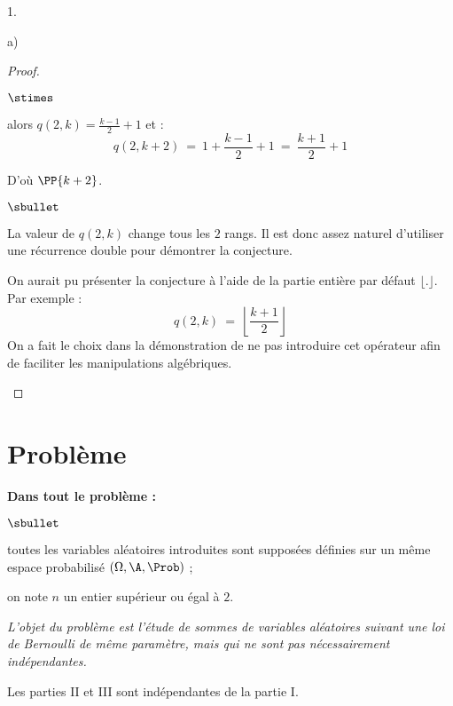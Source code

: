 \documentclass[11pt]{article}%
\begin{document}
\begin{noliste}{1.}
\begin{noliste}{a)}
\begin{proof}
\begin{noliste}{\fitem}
\begin{noliste}{$\stimes$}
        \item {} alors $q(2, k) = \frac{k-1}{2}
          + 1$ et :
          \[
          q(2, k+2) \ = \ 1 + \dfrac{k-1}{2} + 1 \ = \ \dfrac{k+1}{2}
          + 1
          \]
        \end{noliste}
        D'où $\PP{k+2}$.
      \end{noliste}
      \begin{remark}
        \begin{noliste}{$\sbullet$}
        \item La valeur de $q(2, k)$ change tous les $2$ rangs. Il est
          donc assez naturel d'utiliser une récurrence double pour
          démontrer la conjecture.

        \item On aurait pu présenter la conjecture à l'aide de la
          partie entière par défaut $\lfloor . \rfloor$.\\
          Par exemple :
          \[
          q(2, k) \ = \ \left\lfloor \dfrac{k+1}{2} \right\rfloor
          \]
          On a fait le choix dans la démonstration de ne pas
          introduire cet opérateur afin de faciliter les manipulations
          algébriques.
        \end{noliste}
      \end{remark}
    \end{proof}    
  \end{noliste}
\end{noliste}



\newpage


\section*{Problème}

\noindent
{\bfseries Dans tout le problème :}
\begin{noliste}{$\sbullet$}
  \item toutes les variables aléatoires introduites sont 
  supposées définies sur un même espace probabilisé $(\Omega, \A, 
  \Prob)$ ;
  
  \item on note $n$ un entier supérieur ou égal à $2$.
\end{noliste}
{\it L'objet du problème est l'étude de sommes de variables 
aléatoires suivant une loi de Bernoulli de même paramètre, mais qui ne 
sont pas nécessairement indépendantes.

\noindent
Les parties II et III sont indépendantes de la partie I.}
\end{document}
